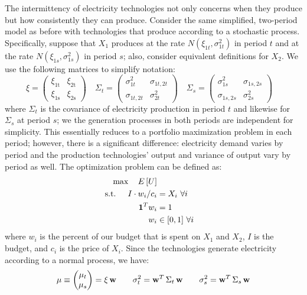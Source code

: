 \documentclass[12pt,a4paper]{extarticle}
\begin{document}
The intermittency of electricity technologies not only concerns when they produce but how consistently they can produce. 
Consider the same simplified, two-period model as before with technologies that produce according to a stochastic process. Specifically, suppose that $X_1$ produces at the rate $N(\xi_{1t}, \sigma_{1t}^2)$ in period $t$ and at the rate $N(\xi_{1s}, \sigma_{1s}^2)$ in period $s$; also, consider equivalent definitions for $X_2$. We use the following matrices to simplify notation:
$$
\xi = 
\begin{pmatrix}
\xi _{\mathrm{1t}} & \xi _{\mathrm{2t}}\\ \xi _{\mathrm{1s}} & \xi _{\mathrm{2s}}
\end{pmatrix}
\quad 
\Sigma_t = \begin{pmatrix}
\sigma_{1t}^2 & \sigma_{1t, 2t} \\ 
\sigma_{1t, 2t} & \sigma_{2t}^2
\end{pmatrix}
\quad 
\Sigma_s = \begin{pmatrix}
\sigma_{1s}^2 & \sigma_{1s, 2s} \\ 
\sigma_{1s, 2s} & \sigma_{2s}^2
\end{pmatrix}
\quad 
$$
where $\Sigma_t$ is the covariance of electricity production in period $t$ and likewise for $\Sigma_s$ at period $s$; we the generation processes in both periods are independent for simplicity. This essentially reduces to a portfolio maximization problem in each period; however, there is a significant difference: electricity demand varies by period and the production technologies' output and variance of output vary by period as well. The optimization problem can be defined as:
\begin{align*}
\max \quad E \left[ U \right] \\
\text{s.t. \quad} I \cdot  w_i / c_i &= X_i \,\, \forall i \\
\textbf{1}^T w_i &= 1 \\
w_i &\in [0,1] \,\, \forall i
\end{align*}
where $w_i$ is the percent of our budget that is spent on $X_1$ and $X_2$, $I$ is the budget, and $c_i$ is the price of $X_i$.  Since the technologies generate electricity according to a normal process, we have:
\begin{equation*}
\mu \equiv
\begin{pmatrix}
\mu_t \\
\mu_s
\end{pmatrix}
=
\xi \, \textbf{w}
\qquad
\sigma_t^2 
=
\textbf{w}^T \,  \Sigma_t \, \textbf{w} \\
\qquad
\sigma_s^2
=
\textbf{w}^T \,  \Sigma_s \, \textbf{w}
\end{equation*}
\end{document}

